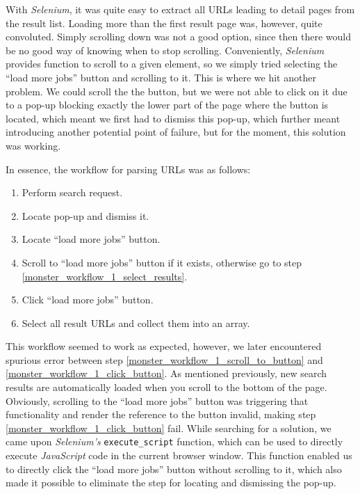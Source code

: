 \documentclass[runningheads]{llncs}
\begin{document}
With \textit{Selenium}, it was quite easy to extract all URLs leading to detail pages from the result list. Loading more than the first result page was, however, quite convoluted. Simply scrolling down was not a good option, since then there would be no good way of knowing when to stop scrolling. Conveniently, \textit{Selenium} provides function to scroll to a given element, so we simply tried selecting the “load more jobs” button and scrolling to it. This is where we hit another problem. We could scroll the the button, but we were not able to click on it due to a pop-up blocking exactly the lower part of the page where the button is located, which meant we first had to dismiss this pop-up, which further meant introducing another potential point of failure, but for the moment, this solution was working.

In essence, the workflow for parsing URLs was as follows:

\begin{enumerate}
  \item Perform search request.
  \item Locate pop-up and dismiss it.
  \item Locate “load more jobs” button.
  \item \label{monster_workflow_1_scroll_to_button}
    Scroll to “load more jobs” button if it exists, otherwise go to step \ref{monster_workflow_1_select_results}.
  \item \label{monster_workflow_1_click_button}
    Click “load more jobs” button.
  \item \label{monster_workflow_1_select_results}
    Select all result URLs and collect them into an array.
\end{enumerate}

This workflow seemed to work as expected, however, we later encountered spurious error between step \ref{monster_workflow_1_scroll_to_button} and \ref{monster_workflow_1_click_button}. As mentioned previously, new search results are automatically loaded when you scroll to the bottom of the page. Obviously, scrolling to the “load more jobs” button was triggering that functionality and render the reference to the button invalid, making step \ref{monster_workflow_1_click_button} fail. While searching for a solution, we came upon \textit{Selenium's} \texttt{execute\_script} function, which can be used to directly execute \textit{JavaScript} code in the current browser window. This function enabled us to directly click the “load more jobs” button without scrolling to it, which also made it possible to eliminate the step for locating and dismissing the pop-up.
\end{document}
